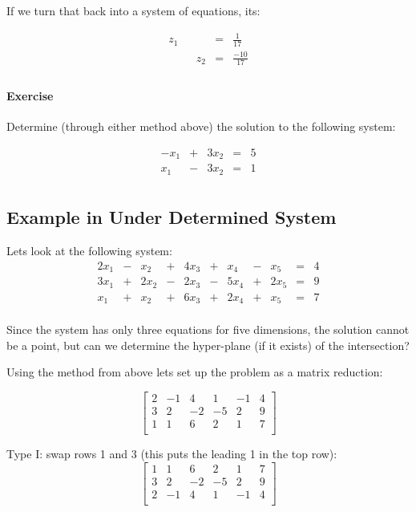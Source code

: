 If we turn that back into a system of equations, its: 

\[\begin{array}{rcrcr}
 z_1 & &  & = & \frac{1}{17}\\
 & & z_2 & = & \frac{-10}{17}\\
\end{array}\]



\paragraph{Exercise} Determine (through either method above) the solution to the following system: 

\[\begin{array}{rcrcr}
-x_1 & +  & 3 x_2 & = & 5\\
x_1 & -  &  3x_2 & = & 1\\
\end{array}\]

\subsection{Example in Under Determined System}
Lets look at the following system: 
\[\begin{array}{rcrcrcrcrcr}
2x_1 & - & x_2 & + & 4x_3 & + & x_4 & - & x_5 & = & 4\\
3x_1 & + & 2x_2 & - & 2x_3 & - & 5x_4 & + & 2x_5 & = & 9\\
x_1 & + & x_2 & + & 6x_3 & + & 2x_4 & + & x_5 & = & 7\\
\end{array}\]

Since the system has only three equations for five dimensions, the solution cannot be a point,
but can we determine the hyper-plane (if it exists) of the intersection? 

Using the method from above lets set up the problem as a matrix reduction: 

\[\left[\begin{array}{ccccc|c} 
2 & -1 & 4 & 1 & -1 & 4\\
3 & 2 & -2 & -5 &  2 & 9\\
1 & 1 & 6 & 2 &  1 & 7\\
\end{array}\right]\]

Type I: swap rows 1 and 3 (this puts the leading 1 in the top row):
\[\left[\begin{array}{ccccc|c} 
1 & 1 & 6 & 2 &  1 & 7\\
3 & 2 & -2 & -5 &  2 & 9\\
2 & -1 & 4 & 1 & -1 & 4\\
\end{array}\right]\]

